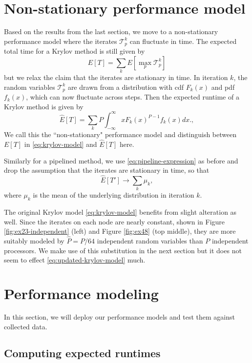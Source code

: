 \documentclass[sigconf, anonymous]{acmart}
\begin{document}
\section{Non-stationary performance model} \label{sec:updated-model}

Based on the results from the last section, we move to a non-stationary performance model where the iterates $\mathcal{T}^k_p$ can fluctuate in time.
The expected total time for a Krylov method is still given by 
$$E[T] = \sum_k E[ \max_p \mathcal{T}^k_p]$$
but we relax the claim that the iterates are stationary in time. In iteration $k$, the random variables $\mathcal{T}^k_p$ are drawn from a distribution with cdf $F_k(x)$ and pdf $f_k(x)$, which can now fluctuate across steps.
Then the expected runtime of a Krylov method is given by 
\begin{equation}
\widehat{E}[T] =  \sum_k P \int ^{\infty}_{-\infty} x F_k(x)^{P-1} f_k(x) dx. \label{eq:updated-krylov-model},
\end{equation}
We call this the ``non-stationary" performance model and distinguish between $E[T]$ in \eqref{eq:krylov-model} and $\widehat{E}[T]$ here.


Similarly for a pipelined method, we use \eqref{eq:pipeline-expression} as before and drop the assumption that the iterates are stationary in time, so that
\begin{equation}
\widehat{E}[T'] \rightarrow  \sum_k \mu_k \label{eq:updated-pipelined-model},
\end{equation}
where $\mu_k$ is the mean of the underlying distribution in iteration $k$. 

The original Krylov model \eqref{eq:krylov-model} benefits from slight alteration as well. 
Since the iterates on each node are nearly constant, shown in Figure \eqref{fig:ex23-independent} (left) and Figure \ref{fig:ex48} (top middle), they are more suitably modeled by $\widehat{P} = P/64$  independent random variables than $P$ independent processors. We make use of this substitution in the next section but it does not seem to effect \eqref{eq:updated-krylov-model} much.


\section{Performance modeling} \label{sec:performance-model}

In this section, we will deploy our performance models and test them against collected data.

\subsection{Computing expected runtimes} \label{sec:computing-runtimes}
\end{document}
